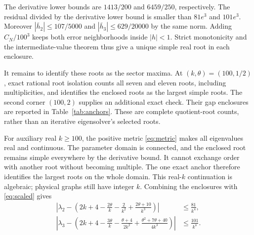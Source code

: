 \documentclass[11pt]{article}
\begin{document}
The derivative lower bounds are $1413/200$ and $6459/250$, respectively.
The residual divided by the derivative lower bound is smaller than
$81e^3$ and $101e^3$. Moreover
$|\bar h_2|\leq107/5000$ and $|\bar h_3|\leq629/20000$ by the same norm.
Adding $C_N/100^3$ keeps both error neighborhoods inside $|h|<1$.
Strict monotonicity and the intermediate-value theorem thus give a
unique simple real root in each enclosure.

It remains to identify these roots as the sector maxima. At
$(k,\theta)=(100,1/2)$, exact rational root isolation counts all seven
and eleven roots, including multiplicities, and identifies the enclosed
roots as the largest simple roots. The second corner $(100,2)$ supplies
an additional exact check. Their gap enclosures are reported in
Table~\ref{tab:anchors}. These are complete quotient-root counts, rather
than an iterative eigensolver's selected roots.

For auxiliary real $k\geq100$, the positive metric
\eqref{eq:metric} makes all eigenvalues real and continuous. The
parameter domain is connected, and the enclosed root remains simple
everywhere by the derivative bound. It cannot exchange order with
another root without becoming multiple. The one exact anchor therefore
identifies the largest roots on the whole domain. This real-$k$
continuation is algebraic; physical graphs still have integer $k$.
Combining the enclosures with \eqref{eq:scaled} gives
\begin{align}
 \left|\lambda_2-\left(2k+4-\frac{2\theta}{k}
           -\frac2{k^2}+\frac{2\theta+10}{k^3}\right)\right|
 &\leq\frac{81}{k^4},\label{eq:lam2}\\
 \left|\lambda_3-\left(2k+4-\frac{3\theta}{k}
           -\frac{\theta+4}{2k^2}
           +\frac{\theta^2+7\theta+40}{4k^3}\right)\right|
 &\leq\frac{101}{k^4}.\label{eq:lam3}
\end{align}

\begin{table}[htbp]
 \centering
 
 \caption{Exact anchors at $k=100$. Each characteristic polynomial
 has all roots isolated using rational intervals of width at most
 $10^{-24}$, and its enclosed largest root is simple. The displayed
 gap-ratio intervals are rounded outward to twelve decimal places
 from the rational enclosures. Full-space ordering uses the analytic
 bounds in Section~\ref{sec:ordering}, rather than these finite checks.}
 \label{tab:anchors}
\end{table}
\end{document}
